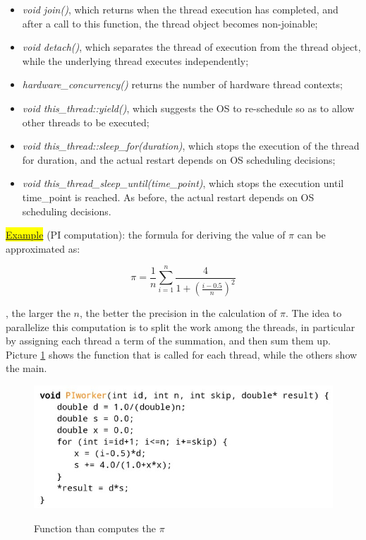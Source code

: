 \begin{itemize}
    \item \textit{void join()}, which returns when the thread execution has completed, and after a call to this function, the thread object becomes non-joinable;
    \item \textit{void detach()}, which separates the thread of execution from the thread object, while the underlying thread executes independently;
    \item \textit{hardware\_concurrency()} returns the number of hardware thread contexts;
    \item \textit{void this\_thread::yield()}, which suggests the OS to re-schedule so as to allow other threads to be executed;
    \item \textit{void this\_thread::sleep\_for(duration)}, which stops the execution of the thread for duration, and the actual restart depends on OS scheduling decisions;
    \item \textit{void this\_thread\_sleep\_until(time\_point)}, which stops the execution until time\_point is reached. As before, the actual restart depends on OS scheduling decisions.
\end{itemize}

\colorbox{yellow}{\underline{Example}} (PI computation): the formula for deriving the value of $\pi$ can be approximated as:

$$
\pi = \frac{1}{n} \sum \limits_{i = 1}^n \frac{4}{1 + (\frac{i - 0.5}{n})^2}
$$

, the larger the $n$, the better the precision in the calculation of $\pi$. The idea to parallelize this computation is to split the work among the threads, in particular by assigning each thread a term of the summation, and then sum them up. Picture \ref{pi_function} shows the function that is called for each thread, while the others show the main.

\begin{figure}[h!]
		\centering
		\includegraphics[scale = 1.4]{img/pi_thread.jpg}
        \label{pi_function}
        \caption{Function than computes the $\pi$}
\end{figure}

